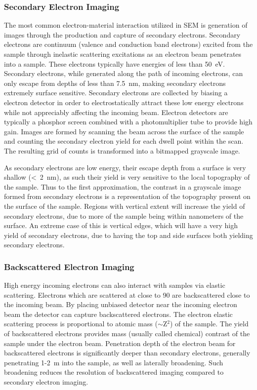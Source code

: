 \subsubsection{Secondary Electron Imaging}
The most common electron-material interaction utilized in SEM is generation of images through the production and capture of secondary electrons. Secondary electrons are continuum (valence and conduction band electrons) excited from the sample through inelastic scattering excitations as an electron beam penetrates into a sample. These electrons typically have energies of less than 50~eV\cite{goldstein2003scanning}. Secondary electrons, while generated along the path of incoming electrons, can only escape from depths of less than 7.5~nm, making secondary electrons extremely surface sensitive\cite{goldstein2003scanning}. Secondary electrons are collected by biasing a electron detector in order to electrostatically attract these low energy electrons while not appreciably affecting the incoming beam. Electron detectors are typically a phosphor screen combined with a photomultiplier tube to provide high gain. Images are formed by scanning the beam across the surface of the sample and counting the secondary electron yield for each dwell point within the scan. The resulting grid of counts is transformed into a bitmapped grayscale image.

As secondary electrons are low energy, their escape depth from a surface is very shallow (<~2~nm), as such their yield is very sensitive to the local topography of the sample. Thus to the first approximation, the contrast in a grayscale image formed from secondary electrons is a representation of the topography present on the surface of the sample. Regions with vertical extent will increase the yield of secondary electrons, due to more of the sample being within nanometers of the surface. An extreme case of this is vertical edges, which will have a very high yield of secondary electrons, due to having the top and side surfaces both yielding secondary electrons.

\subsubsection{Backscattered Electron Imaging}
High energy incoming electrons can also interact with samples via elastic scattering. Electrons which are scattered at close to 90\degree{} are backscattered close to the incoming beam. By placing unbiased detector near the incoming electron beam the detector can capture backscattered electrons. The electron elastic scattering process is proportional to atomic mass ($\sim$Z$^2$) of the sample. The yield of backscattered electrons provides mass (usually called chemical) contrast of the sample under the electron beam. Penetration depth of the electron beam for backscattered electrons is significantly deeper than secondary electrons, generally penetrating 1-2~\micro{}m into the sample, as well as laterally broadening. Such broadening reduces the resolution of backscattered imaging compared to secondary electron imaging.

